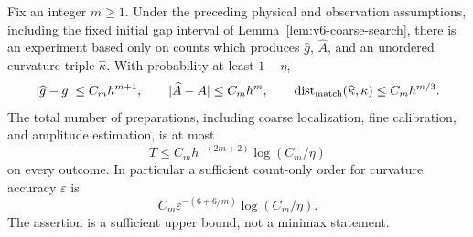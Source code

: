 \begin{theorem}
\label{thm:v6-count-acquisition}
Fix an integer $m\ge1$. Under the preceding physical and observation
assumptions, including the fixed initial gap interval of
Lemma~\ref{lem:v6-coarse-search}, there is an experiment based only
on counts which produces $\widehat g$, $\widehat A$, and an unordered
curvature triple $\widehat\kappa$. With probability at least $1-\eta$,
\begin{equation}\label{eq:v6-count-errors}
 |\widehat g-g|\le C_m h^{m+1},\qquad
 |\widehat A-A|\le C_m h^m,\qquad
 \operatorname{dist}_{\rm match}(\widehat\kappa,\kappa)
                 \le C_m h^{m/3}.
\end{equation}
The total number of preparations, including coarse localization, fine
calibration, and amplitude estimation, is at most
\begin{equation}\label{eq:v6-count-cost}
 T\le C_m h^{-(2m+2)}\log(C_m/\eta)
\end{equation}
on every outcome. In particular a sufficient count-only order for
curvature accuracy $\varepsilon$ is
\begin{equation}\label{eq:v6-count-epsilon}
 C_m\varepsilon^{-(6+6/m)}\log(C_m/\eta).
\end{equation}
The assertion is a sufficient upper bound, not a minimax statement.
\end{theorem}
